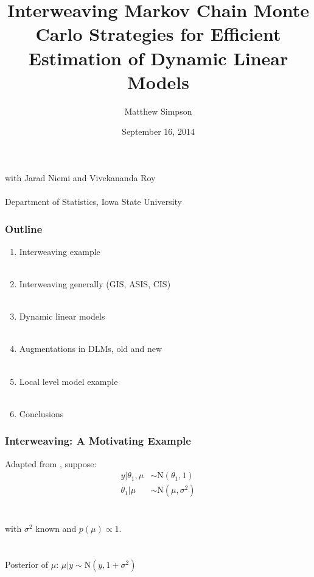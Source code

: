 \documentclass[xcolor=dvipsnames]{beamer}
\title[Interweaving MCMC Strats for DLMs]{Interweaving Markov Chain Monte Carlo Strategies for Efficient
Estimation of Dynamic Linear Models}
\author[Matt Simpson]{Matthew Simpson}
\date{September 16, 2014}
\institute[]{Departments of Statistics and Economics, Iowa State University}
\newcommand\N{\mathrm{N}}
\begin{document}
\begin{frame}
\titlepage
\begin{center}
with Jarad Niemi and Vivekananda Roy\\~\\
\scriptsize{Department of Statistics, Iowa State University}
\end{center}
\end{frame}

\begin{frame}
\frametitle{Outline}
\begin{enumerate}
\item Interweaving example\\~\\
\item Interweaving generally (GIS, ASIS, CIS)\\~\\
\item Dynamic linear models\\~\\
\item Augmentations in DLMs, old and new\\~\\
\item Local level model example\\~\\
\item Conclusions
\end{enumerate}
\end{frame}

\begin{frame}
\frametitle{Interweaving: A Motivating Example}
Adapted from \citet{yu2011center}, suppose:\\
\begin{align*}
y|\theta_1, \mu & \sim \N(\theta_1, 1) \\
\theta_1|\mu & \sim \N(\mu, \sigma^2) 
\end{align*}\\~\\
with $\sigma^2$ known and $p(\mu)\propto 1$.\\~\\~\\

Posterior of $\mu$: $\mu|y \sim \N(y,1+\sigma^2)$

\end{frame}
\end{document}
